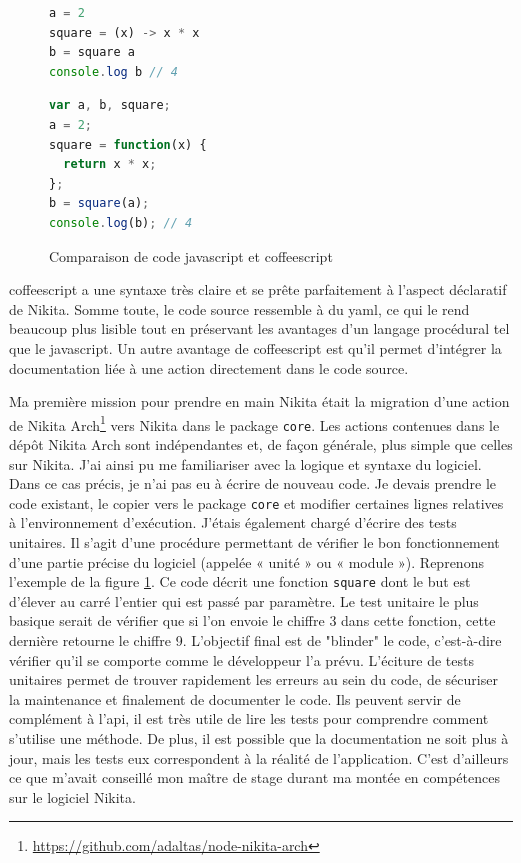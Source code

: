 \documentclass[12pt, french]{report}
\begin{document}
\begin{figure}[H]
\begin{minipage}{0.45\textwidth}
\begin{lstlisting}[language=JavaScript]
a = 2
square = (x) -> x * x
b = square a
console.log b // 4
\end{lstlisting}
\end{minipage}\hfill
\begin{minipage}{0.45\textwidth}
\begin{lstlisting}[language=JavaScript]
var a, b, square;
a = 2;
square = function(x) {
  return x * x;
};
b = square(a);
console.log(b); // 4
\end{lstlisting}
\end{minipage}\hfill
\centering
\caption{Comparaison de code \gls{javascript} et \gls{coffeescript}}
\label{code:jscoffeecomparison}
\end{figure}

\gls{coffeescript} a une syntaxe très claire et se prête parfaitement à l'aspect déclaratif de Nikita. Somme toute, le code source ressemble à du \gls{yaml}, ce qui le rend beaucoup plus lisible tout en préservant les avantages d'un langage procédural tel que le \gls{javascript}. Un autre avantage de \gls{coffeescript} est qu'il permet d'intégrer la documentation liée à une action directement dans le code source.

Ma première mission pour prendre en main Nikita était la migration d'une action de Nikita Arch\footnote{\href{https://github.com/adaltas/node-nikita-arch}{https://github.com/adaltas/node-nikita-arch}} vers Nikita dans le package \texttt{core}. Les actions contenues dans le dépôt Nikita Arch sont indépendantes et, de façon générale, plus simple que celles sur Nikita. J'ai ainsi pu me familiariser avec la logique et syntaxe du logiciel. Dans ce cas précis, je n'ai pas eu à écrire de nouveau code. Je devais prendre le code existant, le copier vers le package \texttt{core} et modifier certaines lignes relatives à l'environnement d'exécution. J'étais également chargé d'écrire des tests unitaires. Il s'agit d'une procédure permettant de vérifier le bon fonctionnement d'une partie précise du logiciel (appelée « unité » ou « module »). Reprenons l'exemple de la figure \ref{code:jscoffeecomparison}. Ce code décrit une fonction \texttt{square} dont le but est d'élever au carré l'entier qui est passé par paramètre. Le test unitaire le plus basique serait de vérifier que si l'on envoie le chiffre 3 dans cette fonction, cette dernière retourne le chiffre 9. L'objectif final est de "blinder" le code, c'est-à-dire vérifier qu'il se comporte comme le développeur l'a prévu. L'éciture de tests unitaires permet de trouver rapidement les erreurs au sein du code, de sécuriser la maintenance et finalement de documenter le code. Ils peuvent servir de complément à l'\gls{api}, il est très utile de lire les tests pour comprendre comment s'utilise une méthode. De plus, il est possible que la documentation ne soit plus à jour, mais les tests eux correspondent à la réalité de l'application. C'est d'ailleurs ce que m'avait conseillé mon maître de stage durant ma montée en compétences sur le logiciel Nikita.
\end{document}
